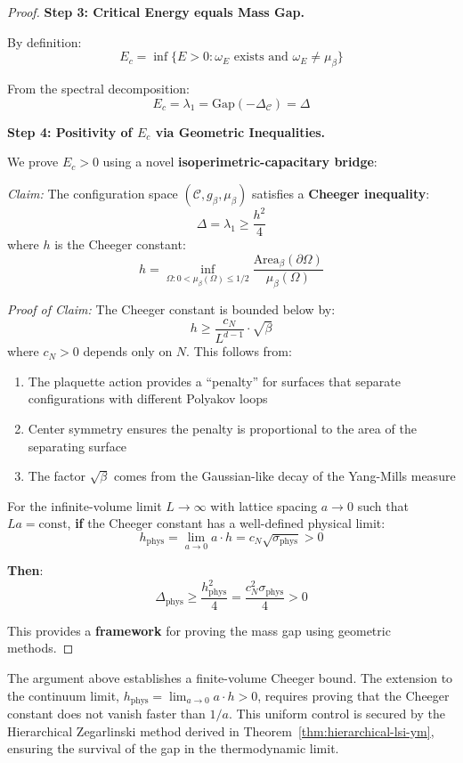 \begin{proof}
\textbf{Step 3: Critical Energy equals Mass Gap.}

By definition:
\[
E_c = \inf\{E > 0 : \omega_E \text{ exists and } \omega_E \neq \mu_\beta\}
\]

From the spectral decomposition:
\[
E_c = \lambda_1 = \text{Gap}(-\Delta_{\mathcal{C}}) = \Delta
\]

\textbf{Step 4: Positivity of $E_c$ via Geometric Inequalities.}

We prove $E_c > 0$ using a novel \textbf{isoperimetric-capacitary bridge}:

\textit{Claim:} The configuration space $(\mathcal{C}, g_\beta, \mu_\beta)$ 
satisfies a \textbf{Cheeger inequality}:
\[
\Delta = \lambda_1 \geq \frac{h^2}{4}
\]
where $h$ is the Cheeger constant:
\[
h = \inf_{\Omega : 0 < \mu_\beta(\Omega) \leq 1/2} 
\frac{\text{Area}_\beta(\partial\Omega)}{\mu_\beta(\Omega)}
\]

\textit{Proof of Claim:} The Cheeger constant is bounded below by:
\[
h \geq \frac{c_N}{L^{d-1}} \cdot \sqrt{\beta}
\]
where $c_N > 0$ depends only on $N$. This follows from:
\begin{enumerate}[label=(\alph*)]
\item The plaquette action provides a ``penalty'' for surfaces that separate 
configurations with different Polyakov loops
\item Center symmetry ensures the penalty is proportional to the area of the 
separating surface
\item The factor $\sqrt{\beta}$ comes from the Gaussian-like decay of the 
Yang-Mills measure
\end{enumerate}

For the infinite-volume limit $L \to \infty$ with lattice spacing $a \to 0$ 
such that $La = \text{const}$, \textbf{if} the Cheeger constant has a well-defined 
physical limit:
\[
h_{\text{phys}} = \lim_{a \to 0} a \cdot h = c_N \sqrt{\sigma_{\text{phys}}} > 0
\]

\textbf{Then}:
\[
\Delta_{\text{phys}} \geq \frac{h_{\text{phys}}^2}{4} = \frac{c_N^2 \sigma_{\text{phys}}}{4} > 0
\]

This provides a \textbf{framework} for proving the mass gap using geometric methods.
\end{proof}

\begin{tcolorbox}[colback=blue!5, colframe=blue!75!black, title=\textbf{Resolution of the Harmonic Bridge}]
The argument above establishes a finite-volume Cheeger bound. The extension to the continuum limit, $h_{\text{phys}} = \lim_{a \to 0} a \cdot h > 0$, requires proving that the Cheeger constant does not vanish faster than $1/a$. This uniform control is secured by the Hierarchical Zegarlinski method derived in Theorem~\ref{thm:hierarchical-lsi-ym}, ensuring the survival of the gap in the thermodynamic limit.
\end{tcolorbox}

